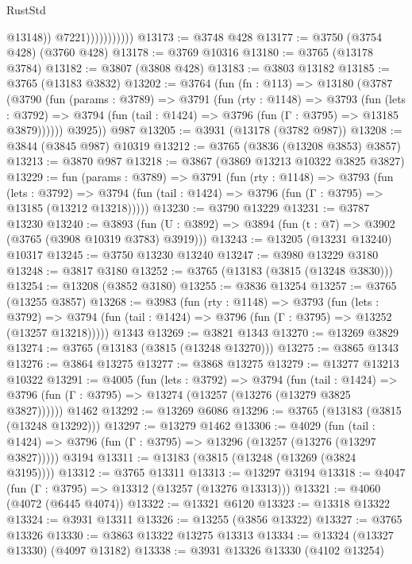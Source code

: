 \begin{lexlean}{RustStd}
\begin{coremodule}
                              @13148))
                          @7221)))))))))))
@13173 := @3748 @428
@13177 := @3750 (@3754 @428) (@3760 @428)
@13178 := @3769 @10316
@13180 := @3765 (@13178 @3784)
@13182 := @3807 (@3808 @428)
@13183 := @3803 @13182
@13185 := @3765 (@13183 @3832)
@13202 := @3764
    (fun (fn : @113) =>
    @13180
      (@3787
        (@3790
          (fun (params : @3789) =>
          @3791
            (fun (rty : @1148) =>
            @3793
              (fun (lets : @3792) =>
              @3794 (fun (tail : @1424) => @3796 (fun (Γ : @3795) => @13185 @3879))))))
        @3925))
    @987
@13205 := @3931 (@13178 (@3782 @987))
@13208 := @3844 (@3845 @987) @10319
@13212 := @3765 (@3836 (@13208 @3853) @3857)
@13213 := @3870 @987
@13218 := @3867 (@3869 @13213 @10322 @3825 @3827)
@13229 := fun (params : @3789) =>
  @3791
    (fun (rty : @1148) =>
    @3793
      (fun (lets : @3792) =>
      @3794 (fun (tail : @1424) => @3796 (fun (Γ : @3795) => @13185 (@13212 @13218)))))
@13230 := @3790 @13229
@13231 := @3787 @13230
@13240 := @3893
    (fun (U : @3892) => @3894 (fun (t : @7) => @3902 (@3765 (@3908 @10319 @3783) @3919)))
@13243 := @13205 (@13231 @13240) @10317
@13245 := @3750 @13230 @13240
@13247 := @3980 @13229 @3180
@13248 := @3817 @3180
@13252 := @3765 (@13183 (@3815 (@13248 @3830)))
@13254 := @13208 (@3852 @3180)
@13255 := @3836 @13254
@13257 := @3765 (@13255 @3857)
@13268 := @3983
    (fun (rty : @1148) =>
    @3793
      (fun (lets : @3792) =>
      @3794 (fun (tail : @1424) => @3796 (fun (Γ : @3795) => @13252 (@13257 @13218)))))
    @1343
@13269 := @3821 @1343
@13270 := @13269 @3829
@13274 := @3765 (@13183 (@3815 (@13248 @13270)))
@13275 := @3865 @1343
@13276 := @3864 @13275
@13277 := @3868 @13275
@13279 := @13277 @13213 @10322
@13291 := @4005
    (fun (lets : @3792) =>
    @3794
      (fun (tail : @1424) =>
      @3796 (fun (Γ : @3795) => @13274 (@13257 (@13276 (@13279 @3825 @3827))))))
    @1462
@13292 := @13269 @6086
@13296 := @3765 (@13183 (@3815 (@13248 @13292)))
@13297 := @13279 @1462
@13306 := @4029
    (fun (tail : @1424) => @3796 (fun (Γ : @3795) => @13296 (@13257 (@13276 (@13297 @3827)))))
    @3194
@13311 := @13183 (@3815 (@13248 (@13269 (@3824 @3195))))
@13312 := @3765 @13311
@13313 := @13297 @3194
@13318 := @4047 (fun (Γ : @3795) => @13312 (@13257 (@13276 @13313)))
@13321 := @4060 (@4072 (@6445 @4074))
@13322 := @13321 @6120
@13323 := @13318 @13322
@13324 := @3931 @13311
@13326 := @13255 (@3856 @13322)
@13327 := @3765 @13326
@13330 := @3863 @13322 @13275 @13313
@13334 := @13324 (@13327 @13330) (@4097 @13182)
@13338 := @3931 @13326 @13330 (@4102 @13254)

\end{coremodule}
\end{lexlean}
